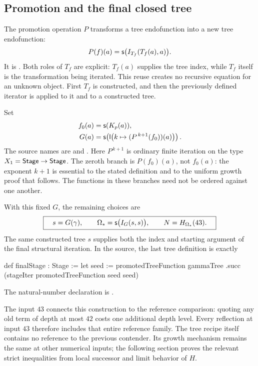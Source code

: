 \subsection{Promotion and the final closed tree}

The promotion operation \(P\) transforms a tree endofunction into a
new tree endofunction:
\begin{equation}\label{eq:tree-promotion}
             P(f)(a)=\mathsf s\bigl(I_{T_f}(T_f(a),a)\bigr).
\end{equation}
It is . Both roles of \(T_f\) are explicit:
\(T_f(a)\) supplies the tree index, while \(T_f\) itself is the
transformation being iterated. This reuse creates no recursive equation
for an unknown object. First \(T_f\) is constructed, and then the
previously defined iterator is applied to it and to a constructed tree.

Set
\begin{align}
 f_0(a)&=\mathsf s(K_p(a)),\label{eq:starting-function}\\
 G(a)&=\mathsf s\!\left(
       \mathsf l\bigl(k\mapsto(P^{\,k+1}(f_0))(a)\bigr)\right).
       \label{eq:promoted-function}
\end{align}
The source names are  and
. Here \(P^{\,k+1}\) is ordinary finite
iteration on the type \(X_1=\mathsf{Stage}\to\mathsf{Stage}\). The zeroth branch is
\(P(f_0)(a)\), not \(f_0(a)\): the exponent \(k+1\) is essential
to the stated definition and to the uniform growth proof that follows.
The functions in these branches need not be ordered against one another.

With this fixed \(G\), the remaining choices are
\begin{equation}\label{eq:final-tree}
 \boxed{\quad s=G(\gamma),\qquad
 \Omega_*=\mathsf s\bigl(I_G(s,s)\bigr),\qquad
 N=H_{\Omega_*}(43).\quad}
\end{equation}
The same constructed tree \(s\) supplies both the index and starting
argument of the final structural iteration. In the source, the last
tree definition is exactly
\begin{LeanCode}
def finalStage : Stage :=
  let seed := promotedTreeFunction gammaTree
  .succ (stageIter promotedTreeFunction seed seed)
\end{LeanCode}
The natural-number declaration is
.

The input \(43\) connects this construction to the reference comparison:
quoting any old term of depth at most \(42\) costs one additional depth
level. Every reflection at input \(43\) therefore includes that entire
reference family. The tree recipe itself contains no reference to the
previous contender. Its growth mechanism remains the same at other
numerical inputs; the following section proves the relevant strict
inequalities from local successor and limit behavior of \(H\).

